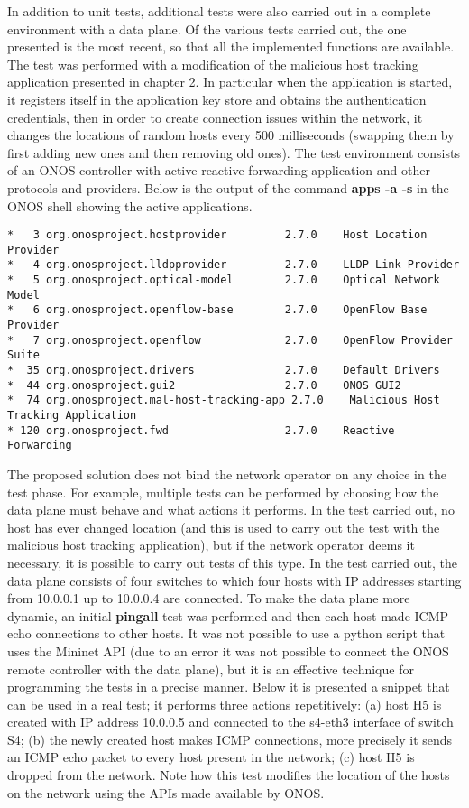 \documentclass[a4paper,10pt]{memoir}
\begin{document}
In addition to unit tests, additional tests were also carried out in a complete environment with a data plane. Of the various tests carried out, the one presented is the most recent, so that all the implemented functions are available. The test was performed with a modification of the malicious host tracking application presented in chapter 2. In particular when the application is started, it registers itself in the application key store and obtains the authentication credentials, then in order to create connection issues within the network, it changes the locations of random hosts every 500 milliseconds (swapping them by first adding new ones and then removing old ones). The test environment consists of an ONOS controller with active reactive forwarding application and other protocols and providers. Below is the output of the command \textbf{apps -a -s} in the ONOS shell showing the active applications.
\begin{lstlisting}
*   3 org.onosproject.hostprovider         2.7.0    Host Location Provider
*   4 org.onosproject.lldpprovider         2.7.0    LLDP Link Provider
*   5 org.onosproject.optical-model        2.7.0    Optical Network Model
*   6 org.onosproject.openflow-base        2.7.0    OpenFlow Base Provider
*   7 org.onosproject.openflow             2.7.0    OpenFlow Provider Suite
*  35 org.onosproject.drivers              2.7.0    Default Drivers
*  44 org.onosproject.gui2                 2.7.0    ONOS GUI2
*  74 org.onosproject.mal-host-tracking-app 2.7.0    Malicious Host Tracking Application
* 120 org.onosproject.fwd                  2.7.0    Reactive Forwarding
\end{lstlisting}
The proposed solution does not bind the network operator on any choice in the test phase. For example, multiple tests can be performed by choosing how the data plane must behave and what actions it performs. In the test carried out, no host has ever changed location (and this is used to carry out the test with the malicious host tracking application), but if the network operator deems it necessary, it is possible to carry out tests of this type. In the test carried out, the data plane consists of four switches to which four hosts with IP addresses starting from 10.0.0.1 up to 10.0.0.4 are connected. To make the data plane more dynamic, an initial \textbf{pingall} test was performed and then each host made ICMP echo connections to other hosts. It was not possible to use a python script that uses the Mininet API (due to an error it was not possible to connect the ONOS remote controller with the data plane), but it is an effective technique for programming the tests in a precise manner. Below it is presented a snippet that can be used in a real test; it performs three actions repetitively: (a) host H5 is created with IP address 10.0.0.5 and connected to the s4-eth3 interface of switch S4; (b) the newly created host makes ICMP connections, more precisely it sends an ICMP echo packet to every host present in the network; (c) host H5 is dropped from the network. Note how this test modifies the location of the hosts on the network using the APIs made available by ONOS.
\end{document}

